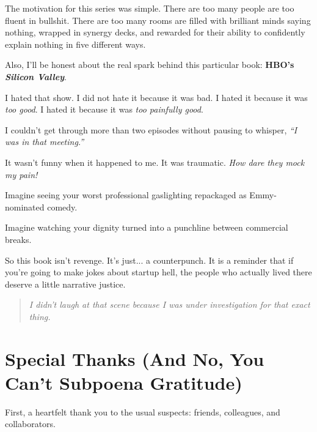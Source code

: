 \documentclass{article}
\begin{document}
  The motivation for this series was simple.
  There are too many people are too fluent in bullshit.
  There are too many rooms are filled with brilliant minds saying nothing, wrapped in synergy decks, and 
  rewarded for their ability to confidently explain nothing in five different ways.
  
  Also, I'll be honest about the real spark behind this particular book:
  \textbf{HBO’s \textit{Silicon Valley}}.
  
  I hated that show.
  I did not hate it because it was bad.
  I hated it because it was \textit{too good}.  
  I hated it because it was \textit{too painfully good}. 
  
  I couldn’t get through more than two episodes without pausing to whisper, 
  \textit{``I was in that meeting.''}
  
  It wasn’t funny when it happened to me.
  It was traumatic.
  \textit{How dare they mock my pain!}
  
  Imagine seeing your worst professional gaslighting repackaged as Emmy-nominated comedy.
  
  Imagine watching your dignity turned into a punchline between commercial breaks.
  
  So this book isn’t revenge.
  It’s just... a counterpunch.
  It is a reminder that if you're going to make jokes about startup hell, the people who 
  actually lived there deserve a little narrative justice.
  
  \begin{quote}
  \textit{I didn’t laugh at that scene because I was under investigation for that exact thing.}\\[1ex]
  \noindent
  \begin{flushright}
  \end{flushright}
  \end{quote}

  \section*{Special Thanks (And No, You Can’t Subpoena Gratitude)}

  First, a heartfelt thank you to the usual suspects:  
  friends, colleagues, and collaborators.  
\end{document}
